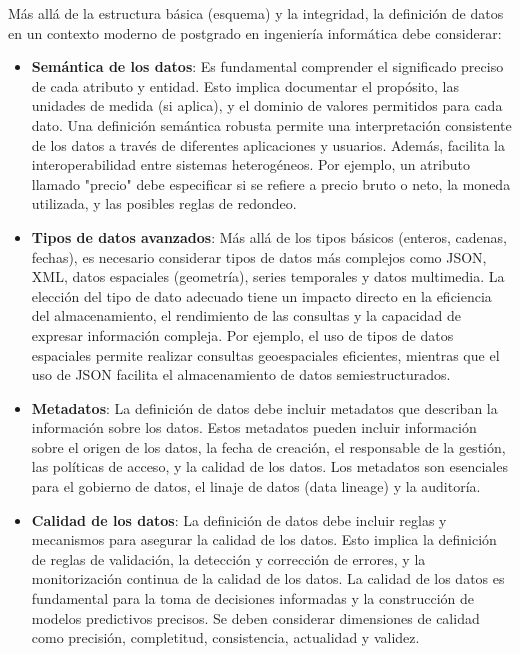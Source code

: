Más allá de la estructura básica (esquema) y la integridad, la definición de datos en un contexto moderno de postgrado en ingeniería informática debe considerar:

\begin{itemize}
    \item \textbf{Semántica de los datos}:  Es fundamental comprender el significado preciso de cada atributo y entidad. Esto implica documentar el propósito, las unidades de medida (si aplica), y el dominio de valores permitidos para cada dato.  Una definición semántica robusta permite una interpretación consistente de los datos a través de diferentes aplicaciones y usuarios.  Además, facilita la interoperabilidad entre sistemas heterogéneos. Por ejemplo, un atributo llamado "precio" debe especificar si se refiere a precio bruto o neto, la moneda utilizada, y las posibles reglas de redondeo.

    \item \textbf{Tipos de datos avanzados}:  Más allá de los tipos básicos (enteros, cadenas, fechas), es necesario considerar tipos de datos más complejos como JSON, XML, datos espaciales (geometría), series temporales y datos multimedia. La elección del tipo de dato adecuado tiene un impacto directo en la eficiencia del almacenamiento, el rendimiento de las consultas y la capacidad de expresar información compleja. Por ejemplo, el uso de tipos de datos espaciales permite realizar consultas geoespaciales eficientes, mientras que el uso de JSON facilita el almacenamiento de datos semiestructurados.

    \item \textbf{Metadatos}: La definición de datos debe incluir metadatos que describan la información sobre los datos. Estos metadatos pueden incluir información sobre el origen de los datos, la fecha de creación, el responsable de la gestión, las políticas de acceso, y la calidad de los datos.  Los metadatos son esenciales para el gobierno de datos, el linaje de datos (data lineage) y la auditoría.

    \item \textbf{Calidad de los datos}: La definición de datos debe incluir reglas y mecanismos para asegurar la calidad de los datos. Esto implica la definición de reglas de validación, la detección y corrección de errores, y la monitorización continua de la calidad de los datos.  La calidad de los datos es fundamental para la toma de decisiones informadas y la construcción de modelos predictivos precisos. Se deben considerar dimensiones de calidad como precisión, completitud, consistencia, actualidad y validez.


\end{itemize}
